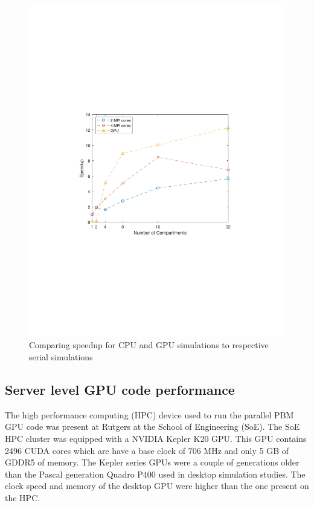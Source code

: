 \documentclass[preprint,10pt,authoryear,review]{elsarticle}
\begin{document}
\begin{figure}[h]
\centering
\includegraphics[scale=0.7,trim=120 240 120 240, clip]{speedup_desktop.pdf}
\caption{Comparing speedup for CPU and GPU simulations to respective serial simulations}
\label{fig:res_desktop_speedup}
\end{figure}



\subsection{Server level GPU code performance}
The high performance computing (HPC) device used to run the parallel PBM GPU code 
was present at Rutgers at the School of Engineering (SoE). The SoE HPC cluster was 
equipped with a NVIDIA Kepler K20 GPU. This GPU contains 2496 CUDA cores which are 
have a base clock of $706$ MHz and only 5 GB of GDDR5 of memory. The Kepler series 
GPUs were a couple of generations older than the Pascal generation Quadro P400 used 
in desktop simulation studies. The clock speed and memory of the desktop GPU were 
higher than the one present on the HPC. 
\end{document}
